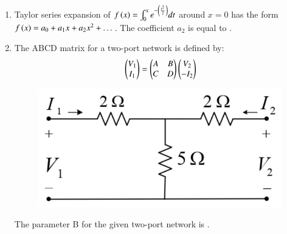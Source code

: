 \documentclass[a4paper, 11pt]{article}
\begin{document}
\begin{enumerate}
    \hfill{}

    \item Taylor series expansion of $f\left(x\right) = \int_{0}^{x} e^{-\left(\frac{t^2}{2}\right)} dt$ around $x=0$ has the form $f\left(x\right) = a_0 + a_1x + a_2x^2 + \dots$. The coefficient $a_2$  is equal to \underline{\hspace{2cm}}.
    
    \hfill{}

    \item The ABCD matrix for a two-port network is defined by:
    \[ \begin{pmatrix}V_1 \\ I_1\end{pmatrix} = \begin{pmatrix}A & B \\ C & D\end{pmatrix} \begin{pmatrix}V_2 \\ -I_2\end{pmatrix} \]
    \begin{figure}[H]
        \centering
        \includegraphics[width=0.6\columnwidth]{figs/q25.png}
        \caption*{}
        \label{fig:q25}
    \end{figure}
    The parameter B for the given two-port network  is \underline{\hspace{2cm}}.

    \hfill{}


\end{enumerate}
\end{document}
